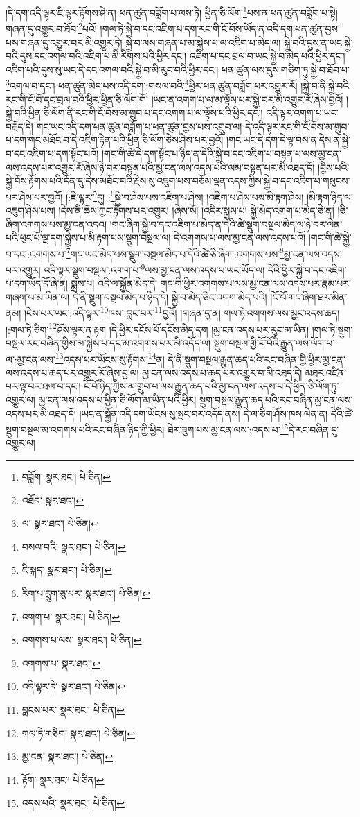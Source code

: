 །དེ་དག་འདི་ལྟར་ཇི་ལྟར་རྟོགས་ཤེ་ན། ཕན་ཚུན་བཟློག་པ་ལས་ཏེ། ཕྱིན་ཅི་ལོག་\footnote{བཟློག་  སྣར་ཐང་།  པེ་ཅིན། }པས་ན་ཕན་ཚུན་བཟློག་པ་སྟེ། གཞན་དུ་འགྱུར་བ་ཐོབ་\footnote{འཐོབ་  སྣར་ཐང་། }པའོ། །གལ་ཏེ་སྐྱེ་བ་དང་འཇིག་པ་དག་རང་གི་ངོ་བོས་ཡོད་ན་འདི་དག་ཕན་ཚུན་བྱས་པས་གཞན་དུ་འགྱུར་བར་མི་འགྱུར་ཏེ། སྐྱེ་བ་ལས་གཞན་པ་མ་སྐྱེས་པ་ལ་འཇིག་པ་མེད་ལ། སྐྱེ་བའི་དུས་ན་ཡང་སྐྱེ་བའི་དུས་དང་འགལ་བའི་འཇིག་པ་མི་རིགས་པའི་ཕྱིར་དང་། འཇིག་པ་དང་བྲལ་བ་ཡང་སྐྱེ་བ་མེད་པའི་ཕྱིར་དང་། འཇིག་པའི་དུས་སུ་ཡང་དེ་དང་འགལ་བའི་སྐྱེ་བ་མི་རུང་བའི་ཕྱིར་དང་། ཕན་ཚུན་ལས་དུས་གཅིག་ཏུ་སྐྱེ་བ་ཐོབ་པ་\footnote{ལ་  སྣར་ཐང་།  པེ་ཅིན། }འགལ་བ་དང་། ཕན་ཚུན་མེད་པས་འདི་དག་:གསལ་བའི་\footnote{བསལ་བའི་  སྣར་ཐང་།  པེ་ཅིན། }ཕྱིར་ཕན་ཚུན་བཟློག་པར་འགྱུར་རོ། །སྐྱེ་བ་ནི་སྐྱེ་བའི་རང་གི་ངོ་བོ་དང་བྲལ་བའི་ཕྱིར་ཕྱིན་ཅི་ལོག་གོ། །ཡང་ན་འགག་པ་ལ་མ་ལྟོས་པར་སྐྱེ་བར་མི་འགྱུར་རོ་ཞེས་བྱའོ། །སྐྱེ་བའི་ཕྱིན་ཅི་ལོག་ནི་རང་གི་ངོ་བོས་མ་གྲུབ་པ་དང་འགག་པ་ལ་ལྟོས་པའི་ཕྱིར་དང་། འདི་ལྟར་འགག་པ་ཡང་བརྗོད་དེ། གང་ཡང་འདི་དག་ཕན་ཚུན་བཟློག་པ་ཕན་ཚུན་བྱས་པས་འགྲུབ་ལ། དེ་འདི་ལྟར་རང་གི་ངོ་བོས་མ་གྲུབ་པ་དག་གང་མཐོང་བ་དེ་འཇིག་རྟེན་པའི་ཕྱིན་ཅི་ལོག་ཅེས་ཤེས་པར་བྱའོ། །གང་ཡང་དེ་དག་དེ་ལྟ་བས་ན་དེས་ན་སྐྱེ་བ་དང་འཇིག་པ་དག་སྟོང་པའོ། །གང་གི་ཚེ་དེ་དག་སྟོང་པ་ཉིད་ན་དེའི་སྐྱེ་བ་དང་འཇིག་པ་བསྟན་པ་ལས་མྱ་ངན་ལས་འདས་པར་འགྱུར་རོ་ཞེས་ཉེ་བར་བསྟན་པའི་མྱ་ངན་ལས་འདས་པའི་ལམ་བསྟན་པར་མི་འཐད་དོ། །བྱིས་པའི་སྐྱེ་བོས་རྟོགས་པའི་དོན་དུ་དེས་མཐོང་བའི་རྗེས་སུ་འཇུག་པས་བཅོམ་ལྡན་འདས་ཀྱིས་སྐྱེ་བ་དང་འཇིག་པ་གསུངས་པར་ཤེས་པར་བྱའོ། །:ཇི་ལྟར་\footnote{ཇི་སྐད་  སྣར་ཐང་།  པེ་ཅིན། }དུ། :\footnote{རིག་པ་དྲུག་ཅུ་པར་  སྣར་ཐང་།  པེ་ཅིན། }སྐྱེ་བ་ཤེས་པས་འཇིག་པ་ཤེས། །འཇིག་པ་ཤེས་པས་མི་རྟག་ཤེས། །མི་རྟག་ཉིད་ལ་འཇུག་ཤེས་པས། །དེས་ནི་ཆོས་ཀྱང་རྟོགས་པར་འགྱུར། །ཞེས་སོ། །འདིར་སྨྲས་པ། སྐྱེ་མེད་འགག་པ་མེད་ཅེ་ན། །ཅི་ཞིག་འགགས་པས་མྱ་ངན་འདའ། །གང་ཞིག་སྐྱེ་བ་དང་འཇིག་པ་མེད་ན་དེའི་ཚེ་སྡུག་བསྔལ་མེད་ལ་ཉེ་བར་ལེན་པའི་ཕུང་པོ་ལྔ་དག་སྐྱེས་པ་མི་རྟག་པས་སྡུག་བསྔལ་ལ། དེ་འགགས་པ་ལས་མྱ་ངན་ལས་འདས་པའོ། །གང་གི་ཚེ་སྐྱེ་བ་དང་:འགགས་པ་\footnote{འགག་པ་  སྣར་ཐང་།  པེ་ཅིན། }གང་ཡང་མེད་པས་སྡུག་བསྔལ་མེད་པ་དེའི་ཚེ་ཅི་ཞིག་:འགགས་པས་\footnote{འགགས་པ་ལས་  སྣར་ཐང་།  པེ་ཅིན། }མྱ་ངན་ལས་འདས་པར་འགྱུར། འདི་ལྟར་སྡུག་བསྔལ་:འགག་པ་\footnote{འགགས་པ་  སྣར་ཐང་། }ལས་མྱ་ངན་ལས་འདས་པ་ཡང་ཡོད་ལ། དེའི་ཕྱིར་སྐྱེ་བ་དང་འཇིག་པ་དག་ཡོད་དོ་ཞེ་ན། སྨྲས་པ། འདི་ལ་སྐྱོན་མེད་དེ། གང་གི་ཕྱིར་འགགས་པ་ལས་མྱ་ངན་ལས་འདས་པར་རྣམ་པར་གཞག་པ་མ་ཡིན་ལ། དེ་ནི་སྡུག་བསྔལ་མེད་པ་ཉིད་དེ། སྐྱེ་བ་མེད་ཅིང་འགག་མེད་པའི། །ངོ་བོ་གང་ཞིག་ཐར་མིན་ནམ། །ངེས་པར་ཡང་:འདི་ལྟར་\footnote{འདི་ལྟར་དེ་  སྣར་ཐང་།  པེ་ཅིན། }ཁས་:བླང་བར་\footnote{བླངས་པར་  སྣར་ཐང་།  པེ་ཅིན། }བྱའོ། །གཞན་དུ་ན། གལ་ཏེ་འགགས་ལས་མྱང་འདས་ཆད། །:གལ་ཏེ་ཅིག་\footnote{གལ་ཏེ་གཅིག་  སྣར་ཐང་།  པེ་ཅིན། }ཤོས་ལྟར་ན་རྟག །དེ་ཕྱིར་དངོས་པོ་དངོས་མེད་དག །མྱ་ངན་འདས་པར་རུང་མ་ཡིན། །གལ་ཏེ་སྡུག་བསྔལ་རང་བཞིན་གྱིས་མ་སྐྱེས་པ་དང་མ་འགགས་པར་མི་འདོད་ལ། སྡུག་བསྔལ་གྱི་ངོ་བོའི་རྒྱུན་ལས་ལོག་པ་ལ་:མྱ་ངན་ལས་\footnote{མྱ་ངན་  སྣར་ཐང་།  པེ་ཅིན། }འདས་པར་ཡོངས་སུ་རྟོགས་\footnote{རྟོག་  སྣར་ཐང་།  པེ་ཅིན། }ན། དེ་ནི་སྡུག་བསྔལ་རྒྱུན་ཆད་པའི་རང་བཞིན་གྱི་ཕྱིར་མྱ་ངན་ལས་འདས་པ་ཆད་པར་འགྱུར་རོ་ཞེས་བྱ་ལ། མྱ་ངན་ལས་འདས་པ་ཆད་པར་འགྱུར་བ་མི་འཐད་དེ། མཐར་འཛིན་པར་ལྟ་བར་ཐལ་བ་དང་། ངོ་བོ་ཉིད་ཀྱིས་མ་གྲུབ་པ་ལས་རྒྱུན་ཆད་པའི་མྱ་ངན་ལས་འདས་པ་དེ་ཕྱིན་ཅི་ལོག་ཏུ་འགྱུར་ལ། མྱ་ངན་ལས་འདས་པ་ཕྱིན་ཅི་ལོག་མ་ཡིན་པའི་ཕྱིར། སྡུག་བསྔལ་རྒྱུན་ཆད་པའི་རང་བཞིན་མྱ་ངན་ལས་འདས་པར་མི་འཐད་དོ། །ཡང་ན་སྐྱོན་འདི་དག་ཡོངས་སུ་སྤང་བར་འདོད་ནས། དེ་ལ་ཅིག་ཤོས་ཁས་ལེན་ན། དེའི་ཚེ་སྡུག་བསྔལ་མ་འགགས་པའི་རང་བཞིན་ཉིད་ཀྱི་ཕྱིར། ཐེར་ཟུག་པས་མྱ་ངན་ལས་:འདས་པ་\footnote{འདས་པའི་  སྣར་ཐང་།  པེ་ཅིན། }དེ་རང་བཞིན་དུ་འགྱུར་ལ། 